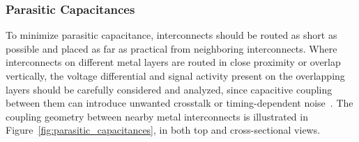 \subsubsection{Parasitic Capacitances}\label{sec:parasitic_cap}

To minimize parasitic capacitance, interconnects should be routed as short as possible and placed as far as practical from neighboring interconnects. Where interconnects on different metal layers are routed in close proximity or overlap vertically, the voltage differential and signal activity present on the overlapping layers should be carefully considered and analyzed, since capacitive coupling between them can introduce unwanted crosstalk or timing-dependent noise~\cite{layout_fundamentals,bogatin_SI}.
The coupling geometry between nearby metal interconnects is illustrated in Figure~\ref{fig:parasitic_capacitances}, in both top and cross-sectional views.

